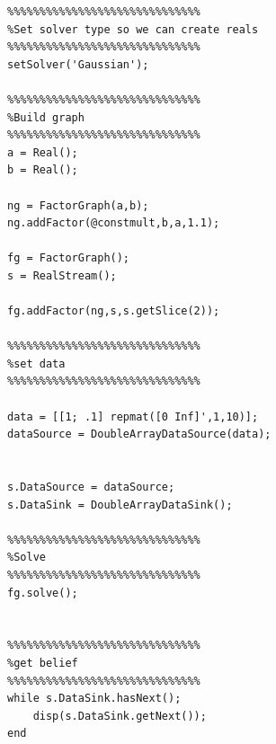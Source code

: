 \ifmatlab
\begin{lstlisting}
%%%%%%%%%%%%%%%%%%%%%%%%%%%%%%                                                                                                
%Set solver type so we can create reals                                                                                       
%%%%%%%%%%%%%%%%%%%%%%%%%%%%%%                                                                                                
setSolver('Gaussian');

%%%%%%%%%%%%%%%%%%%%%%%%%%%%%%                                                                                                
%Build graph                                                                                                                  
%%%%%%%%%%%%%%%%%%%%%%%%%%%%%%                                                                                                
a = Real();
b = Real();

ng = FactorGraph(a,b);
ng.addFactor(@constmult,b,a,1.1);

fg = FactorGraph();
s = RealStream();

fg.addFactor(ng,s,s.getSlice(2));

%%%%%%%%%%%%%%%%%%%%%%%%%%%%%%                                                                                                
%set data                                                                                                                     
%%%%%%%%%%%%%%%%%%%%%%%%%%%%%%                                                                                                

data = [[1; .1] repmat([0 Inf]',1,10)];
dataSource = DoubleArrayDataSource(data);


s.DataSource = dataSource;
s.DataSink = DoubleArrayDataSink();

%%%%%%%%%%%%%%%%%%%%%%%%%%%%%%                                                                                                
%Solve                                                                                                                        
%%%%%%%%%%%%%%%%%%%%%%%%%%%%%%                                                                                                
fg.solve();


%%%%%%%%%%%%%%%%%%%%%%%%%%%%%%                                                                                                
%get belief                                                                                                                        
%%%%%%%%%%%%%%%%%%%%%%%%%%%%%%                                                                                                
while s.DataSink.hasNext();
    disp(s.DataSink.getNext());
end
\end{lstlisting}
\fi

